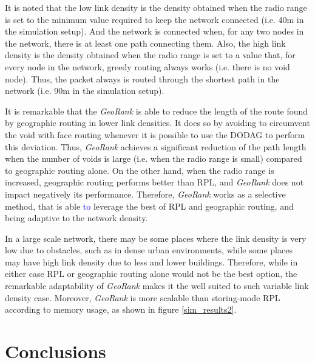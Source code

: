 \documentclass[final,authoryear,3p,twocolumn]{elsarticle}
\newcommand{\removed}[1]{}
\newcommand{\rev}{\textcolor{blue}}
\begin{document}
It is noted that the low link density is the density obtained when the radio range is set to the minimum value required to keep the network connected (i.e. 40m in the simulation setup). And the network is connected when, for any two nodes in the network, there is at least one path connecting them. Also, the high link density is the density obtained when the radio range is set to a value that, for every node in the network, greedy routing always works (i.e. there is no void node). Thus, the packet always is routed through the shortest path in the network (i.e. 90m in the simulation setup).

It is remarkable that the \textit{GeoRank} is able to reduce the length of the route found by geographic routing in lower link densities. It does so by avoiding to circumvent the void with face routing whenever it is possible to use the DODAG to perform this deviation. Thus, \textit{GeoRank} achieves a significant reduction of the path length when the number of voids is large (i.e. when the radio range is small) compared to geographic routing alone. On the other hand, when the radio range is increased, geographic routing performs better than RPL, and \textit{GeoRank} does not impact negatively its performance. Therefore, \textit{GeoRank} works as a selective method, that is able \rev{to} leverage the best of RPL and geographic routing, and being adaptive to the network density.

In a large scale network,\removed{as a smart street lighting,} there may be some places where the link density is very low due to obstacles, such as in dense urban environments, while some places may have high link density due to less and lower buildings. Therefore, while in either case RPL or geographic routing alone would not be the best option, the remarkable adaptability of \textit{GeoRank} makes it the well suited to such variable link density case. Moreover, \textit{GeoRank} is more scalable than storing-mode RPL according to memory usage, as shown in figure \ref{sim_results2}.

\section{Conclusions}
\label{secConclusion}
\end{document}
